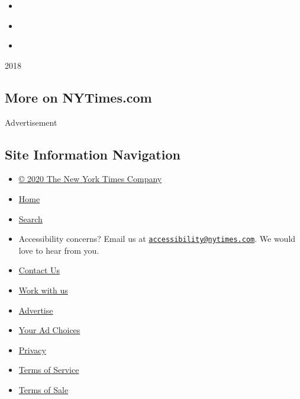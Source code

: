 \begin{itemize}
\tightlist
\item
  \href{undefined/interactive/2018/09/12/technology/kids-apps-data-privacy-google-twitter.html}{}
\item
  \href{https://www.nytimes.com/2018/05/10/technology/cellphone-tracking-law-enforcement.html}{}
\item
  \href{https://www.nytimes.com/2018/05/19/technology/phone-apps-stalking.html}{}
\end{itemize}

2018

\hypertarget{more-on-nytimescom}{%
\subsection{More on NYTimes.com}\label{more-on-nytimescom}}

Advertisement

\hypertarget{site-information-navigation}{%
\subsection{Site Information
Navigation}\label{site-information-navigation}}

\begin{itemize}
\tightlist
\item
  \href{https://help.nytimes.com/hc/en-us/articles/115014792127-Copyright-notice}{©
  2020 The New York Times Company}
\item
  \href{https://www.nytimes.com}{Home}
\item
  \href{https://www.nytimes.com/search/}{Search}
\item
  Accessibility concerns? Email us at
  \href{mailto:accessibility@nytimes.com}{\nolinkurl{accessibility@nytimes.com}}.
  We would love to hear from you.
\item
  \href{https://help.nytimes.com/hc/en-us/articles/115015385887-Contact-Us}{Contact
  Us}
\item
  \href{https://www.nytco.com/careers/}{Work with us}
\item
  \href{https://nytmediakit.com/}{Advertise}
\item
  \href{https://help.nytimes.com/hc/en-us/articles/115014892108-Privacy-policy\#pp}{Your
  Ad Choices}
\item
  \href{https://help.nytimes.com/hc/en-us/articles/115014892108-Privacy-policy}{Privacy}
\item
  \href{https://help.nytimes.com/hc/en-us/articles/115014893428-Terms-of-service}{Terms
  of Service}
\item
  \href{https://help.nytimes.com/hc/en-us/articles/115014893968-Terms-of-sale}{Terms
  of Sale}
\end{itemize}


